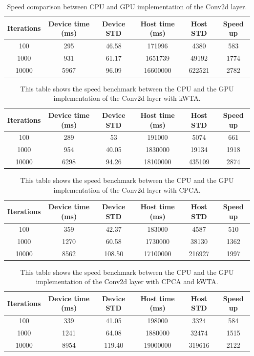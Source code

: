\documentclass[11pt]{report}
\begin{document}
\begin{table}[h!]
\centering
\begin{tabular}{ c c c c c c }
Iterations & Device time (ms) & Device STD & Host time (ms) & Host STD & Speed up\\
\hline
100   & 295  & 46.58 & 171996   & 4380   & 583 \\
1000  & 931  & 61.17 & 1651739  & 49192  & 1774 \\
10000 & 5967 & 96.09 & 16600000 & 622521 & 2782
\end{tabular}
\caption[Speed benchmark: Conv2d layer]{Speed comparison between CPU and GPU implementation of the Conv2d layer.}
\end{table}

\begin{table}[h!]
\centering
\begin{tabular}{ c c c c c c }
Iterations & Device time (ms) & Device STD & Host time (ms) & Host STD & Speed up\\
\hline
100   & 289  & 53    & 191000   & 5074   & 661 \\
1000  & 954  & 40.05 & 1830000  & 19134  & 1918 \\
10000 & 6298 & 94.26 & 18100000 & 435109 & 2874
\end{tabular}
\caption[Speed benchmark: Conv2d layer with kWTA]{This table shows the speed benchmark between the CPU and the GPU implementation of the Conv2d layer with kWTA.}
\end{table}

\begin{table}[h!]
\centering
\begin{tabular}{ c c c c c c }
Iterations & Device time (ms) & Device STD & Host time (ms) & Host STD & Speed up\\
\hline
100   & 359  & 42.37  & 183000   & 4587   & 510 \\
1000  & 1270 & 60.58  & 1730000  & 38130  & 1362 \\
10000 & 8562 & 108.50 & 17100000 & 216927 & 1997
\end{tabular}
\caption[Speed benchmark: Conv2d layer with CPCA]{This table shows the speed benchmark between the CPU and the GPU implementation of the Conv2d layer with CPCA.}
\end{table}

\begin{table}[h!]
\centering
\begin{tabular}{ c c c c c c }
Iterations & Device time (ms) & Device STD & Host time (ms) & Host STD & Speed up\\
\hline
100   & 339  & 41.05  & 198000   & 3324   & 584 \\
1000  & 1241 & 64.08  & 1880000  & 32474  & 1515 \\
10000 & 8954 & 119.40 & 19000000 & 319616 & 2122
\end{tabular}
\caption[Speed benchmark: Conv2d layer with CPCA and kWTA]{This table shows the speed benchmark between the CPU and the GPU implementation of the Conv2d layer with CPCA and kWTA.}
\end{table}
\end{document}
